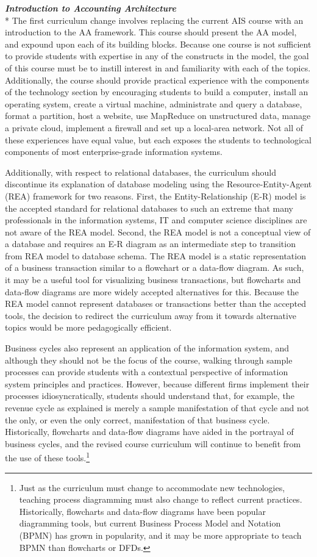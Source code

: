 \documentclass[12pt]{article}
\newcommand{\SubSubSection}[1]{{\centering{}\normalsize{}\textbf{\emph{#1}}}\\*\indent{}}
\begin{document}
\SubSubSection{Introduction to Accounting Architecture}
The first curriculum change involves replacing the current AIS course with an introduction to the AA framework. This course should present the AA model, and expound upon each of its building blocks. Because one course is not sufficient to provide students with expertise in any of the constructs in the model, the goal of this course must be to instill interest in and familiarity with each of the topics. Additionally, the course should provide practical experience with the components of the technology section by encouraging students to build a computer, install an operating system, create a virtual machine, administrate and query a database, format a partition, host a website, use MapReduce on unstructured data, manage a private cloud, implement a firewall and set up a local-area network. Not all of these experiences have equal value, but each exposes the students to technological components of most enterprise-grade information systems.

Additionally, with respect to relational databases, the curriculum should discontinue its explanation of database modeling using the Resource-Entity-Agent (REA) framework for two reasons. First, the Entity-Relationship (E-R) model is the accepted standard for relational databases to such an extreme that many professionals in the information systems, IT and computer science disciplines are not aware of the REA model. Second, the REA model is not a conceptual view of a database and requires an E-R diagram as an intermediate step to transition from REA model to database schema. The REA model is a static representation of a business transaction similar to a flowchart or a data-flow diagram. As such, it may be a useful tool for visualizing business transactions, but flowcharts and data-flow diagrams are more widely accepted alternatives for this. Because the REA model cannot represent databases or transactions better than the accepted tools, the decision to redirect the curriculum away from it towards alternative topics would be more pedagogically efficient.

Business cycles also represent an application of the information system, and although they should not be the focus of the course, walking through sample processes can provide students with a contextual perspective of information system principles and practices. However, because different firms implement their processes idiosyncratically, students should understand that, for example, the revenue cycle as explained is merely a sample manifestation of that cycle and not the only, or even the only correct, manifestation of that business cycle. Historically, flowcharts and data-flow diagrams have aided in the portrayal of business cycles, and the revised course curriculum will continue to benefit from the use of these tools.\footnote{Just as the curriculum must change to accommodate new technologies, teaching process diagramming must also change to reflect current practices. Historically, flowcharts and data-flow diagrams have been popular diagramming tools, but current Business Process Model and Notation (BPMN) has grown in popularity, and it may be more appropriate to teach BPMN than flowcharts or DFDs.}
\end{document}

